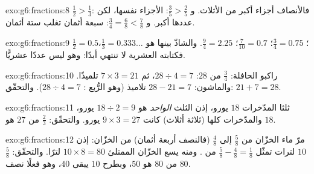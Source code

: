 \begin{solution}{exo:g6:fractions:8}
$\frac12 > \frac13$: فالأنصاف أجزاء أكبر من الأثلاث.
و $\frac35 > \frac25$: الأجزاء نفسها، لكن عددها أكبر.
و $\frac34 = \frac68 < \frac78$: سبعة أثمان تغلب ستة أثمان.
\end{solution}

\begin{solution}{exo:g6:fractions:9}
$\frac12 = 0.5$؛ \quad $\frac34 = 0.75$؛ \quad
$\frac{7}{10} = 0.7$؛ \quad $\frac94 = 2.25$. والشاذّ بينها هو
$\frac13 = 0.333\dots$، فكتابته العشرية لا تنتهي أبدًا: وهو ليس
عددًا عشريًّا.
\end{solution}

\begin{solution}{exo:g6:fractions:10}
راكبو الحافلة: $\frac34$ من $28$: $28 \div 4 = 7$، ثم
$7 \times 3 = 21$ تلميذًا. والماشون: $28 - 21 = 7$ تلاميذ (وهو
الرُّبع : $28 \div 4 = 7$). والتحقّق: $21 + 7 = 28$.
\end{solution}

\begin{solution}{exo:g6:fractions:11}
ثلثا المدّخرات $18$ يورو، إذن الثلث \emph{الواحد} هو
$18 \div 2 = 9$ يورو، والمدّخرات كلها (ثلاثة أثلاث) كانت
$9 \times 3 = 27$ يورو. والتحقّق: $\frac23$ من $27$ هو $18$.
\end{solution}

\begin{solution}{exo:g6:fractions:12}
مرّ ماء الخزّان من $\frac58$ إلى $\frac48$ (فالنصف أربعة
أثمان) من الخزّان: إذن $10$ لترات تمثّل
$\frac58 - \frac48 = \frac18$ من . ومنه يسع الخزّان الممتلئ
$10 \times 8 = 80$ لترًا. والتحقّق: $\frac58$ من $80$ هو $50$، وبطرح
$10$ يبقى $40$، وهو فعلًا نصف $80$.
\end{solution}

